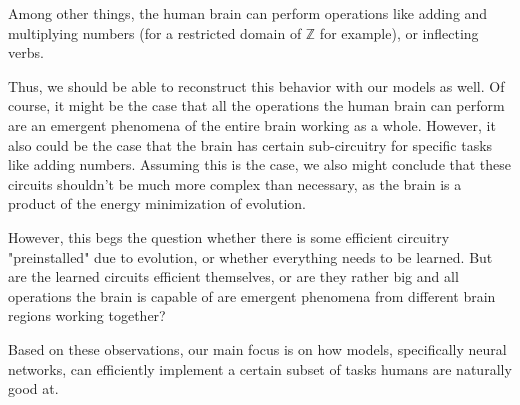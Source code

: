 \documentclass[../../main.tex]{subfiles}
\begin{document}
    \begin{premise}
        Among other things, the human brain can perform operations like adding and multiplying numbers (for a restricted domain of $\mathbb{Z}$ for example), or inflecting verbs.
    \end{premise}

    Thus, we should be able to reconstruct this behavior with our models as well. Of course, it might be the case that all the operations the human brain can perform are an emergent phenomena of the entire brain working as a whole. However, it also could be the case that the brain has certain sub-circuitry for specific tasks like adding numbers. Assuming this is the case, we also might conclude that these circuits shouldn't be much more complex than necessary, as the brain is a product of the energy minimization of evolution.

    \begin{remark}
        However, this begs the question whether there is some efficient circuitry "preinstalled" due to evolution, or whether everything needs to be learned. But are the learned circuits efficient themselves, or are they rather big and all operations the brain is capable of are emergent phenomena from different brain regions working together?
    \end{remark}

    Based on these observations, our main focus is on how models, specifically neural networks, can efficiently implement a certain subset of tasks humans are naturally good at.
\end{document}
